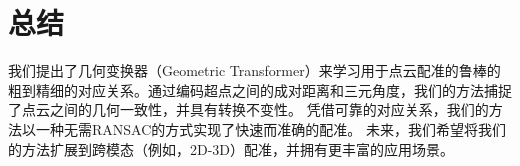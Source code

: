 %
%
%
%
%
%


\chapter{总结}
我们提出了几何变换器（Geometric Transformer）来学习用于点云配准的鲁棒的粗到精细的对应关系。通过编码超点之间的成对距离和三元角度，我们的方法捕捉了点云之间的几何一致性，并具有转换不变性。
凭借可靠的对应关系，我们的方法以一种无需RANSAC的方式实现了快速而准确的配准。
未来，我们希望将我们的方法扩展到跨模态（例如，2D-3D）配准，并拥有更丰富的应用场景。